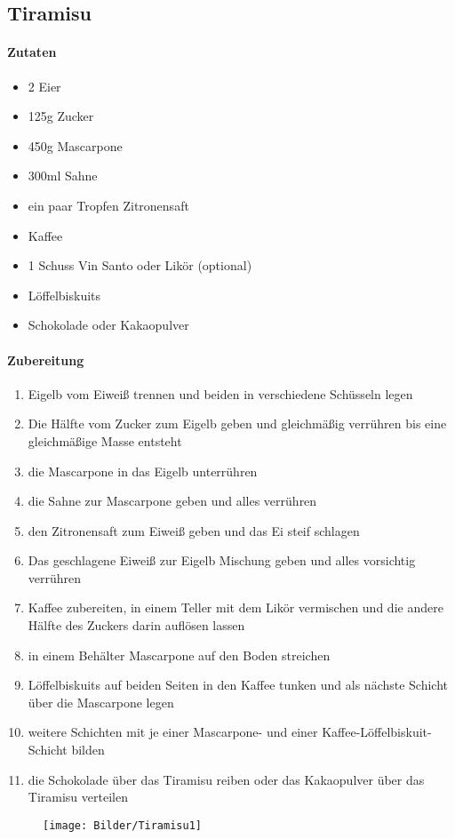 \newpage
\subsection{Tiramisu}
\paragraph{Zutaten}
\begin{itemize}[noitemsep]
	\item 2 Eier
	\item 125g Zucker
	\item 450g Mascarpone
	\item 300ml Sahne
	\item ein paar Tropfen Zitronensaft
	\item Kaffee
	\item 1 Schuss Vin Santo oder Likör (optional)
	\item Löffelbiskuits
	\item Schokolade oder Kakaopulver
\end{itemize}
\paragraph{Zubereitung}
\begin{enumerate}[noitemsep]
	\item Eigelb vom Eiweiß trennen und beiden in verschiedene Schüsseln legen
	\item Die Hälfte vom Zucker zum Eigelb geben und gleichmäßig verrühren bis eine gleichmäßige Masse entsteht 
	\item die Mascarpone in das Eigelb unterrühren
	\item die Sahne zur Mascarpone geben und alles verrühren
	\item den Zitronensaft zum Eiweiß geben und das Ei steif schlagen
	\item Das geschlagene Eiweiß zur Eigelb Mischung geben und alles vorsichtig verrühren
	\item Kaffee zubereiten, in einem Teller mit dem Likör vermischen und die andere Hälfte des Zuckers darin auflösen lassen
	\item in einem Behälter Mascarpone auf den Boden streichen
	\item Löffelbiskuits auf beiden Seiten in den Kaffee tunken und als nächste Schicht über die Mascarpone legen
	\item weitere Schichten mit je einer Mascarpone- und einer Kaffee-Löffelbiskuit-Schicht bilden
	\item die Schokolade über das Tiramisu reiben oder das Kakaopulver über das Tiramisu verteilen
\end{enumerate}
\begin{figure}[h]
\centering
\texttt{[image: Bilder/Tiramisu1]}
\end{figure}